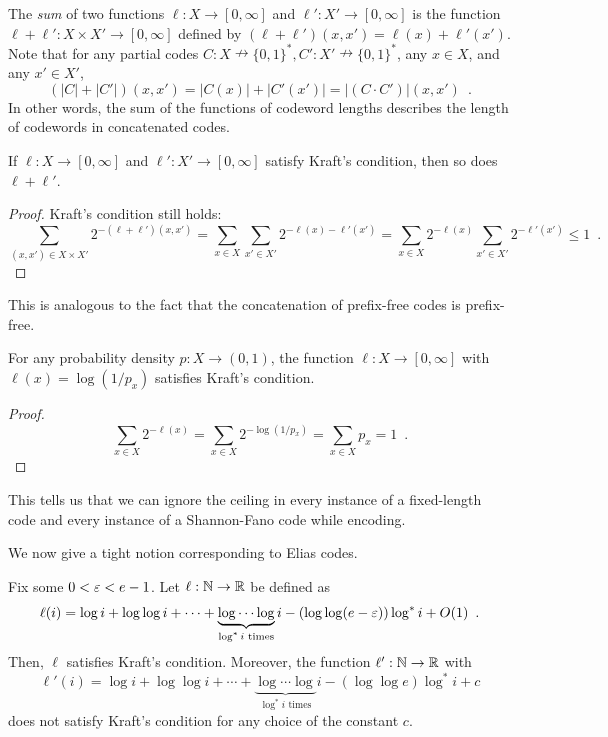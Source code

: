 \documentclass[format=acmsmall, review=false, screen=true]{acmart}
\begin{document}
The \emph{sum} of two functions $\ell : X \to [0, \infty]$ and
$\ell' : X' \to [0, \infty]$ is the function
$\ell + \ell' : X \times X' \to [0, \infty]$ defined by
$(\ell + \ell') (x, x') = \ell(x) + \ell'(x')$. Note that for any
partial codes
$C : X \nrightarrow \{0, 1\}^*, C' : X' \nrightarrow \{0, 1\}^*$, any
$x \in X$, and any $x' \in X'$,
\[
(|C| + |C'|)(x, x') = |C(x)| + |C'(x')| = |(C \cdot C')|(x, x') \enspace .
\]
In other words, the sum of the functions of codeword lengths describes
the length of codewords in concatenated codes.

\begin{lem}
  If $\ell : X \to [0, \infty]$ and $\ell' : X' \to [0,
  \infty]$ satisfy Kraft's condition, then so does $\ell + \ell'$.
\end{lem}
\begin{proof}
  Kraft's condition still holds:
  \[
  \sum_{(x, x') \in X \times X'} 2^{-(\ell + \ell')(x, x')} = \sum_{x
    \in X} \sum_{x' \in X'} 2^{-\ell(x) - \ell'(x')} = \sum_{x \in X}
  2^{-\ell(x)} \sum_{x' \in X'} 2^{-\ell'(x')} \leq 1 \enspace
  . 
  \]
\end{proof}
This is analogous to the fact that the concatenation of prefix-free
codes is prefix-free.

\begin{lem}
  For any probability density $p : X \to (0, 1)$, the function
  $\ell : X \to [0, \infty]$ with $\ell(x) = \log (1/p_x)$ satisfies
  Kraft's condition.
\end{lem}
\begin{proof}
  \[
  \sum_{x \in X} 2^{-\ell(x)} = \sum_{x \in X} 2^{-\log (1/p_x)} =
  \sum_{x \in X} p_x = 1 \enspace . 
  \]
\end{proof}
This tells us that we can ignore the ceiling in every instance of a
fixed-length code and every instance of a Shannon-Fano code while
encoding.

We now give a tight notion corresponding to Elias codes.
\begin{thm}
  Fix some $0 < \varepsilon < e - 1$. Let $\ell : \mathbb{N} \to \mathbb{R}$ be defined as
  \[
  \ell(i) = \log i + \log \log i + \cdots + \underbrace{\log \cdots
    \log}_{\text{$\log^* i$ times}} i - (\log \log (e - \varepsilon)) \log^*
  i + O(1) \enspace .
  \]
  Then, $\ell$ satisfies Kraft's condition. Moreover, the function
  $\ell' : \mathbb{N} \to \mathbb{R}$ with
  \[
  \ell'(i) = \log i + \log \log i + \cdots + \underbrace{\log \cdots
    \log}_{\text{$\log^* i$ times}} i - (\log \log e) \log^* i + c
  \]
  does not satisfy Kraft's condition for any choice of the constant
  $c$.
\end{thm}
\end{document}
